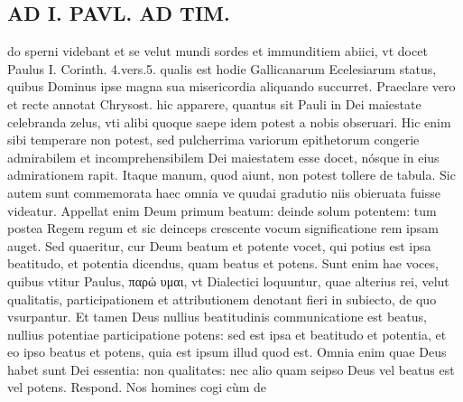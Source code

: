 \documentclass{article}
\begin{document}
\begin{pages}
\section*{AD I. PAVL. AD TIM. }
\marginpar{[ p.300 ]}\pstart do sperni videbant et se velut mundi sordes et immunditiem abiici, vt docet Paulus I. Corinth. 4.vers.5. qualis est hodie Gallicanarum Ecelesiarum status, quibus Dominus ipse magna sua misericordia aliquando succurret. Praeclare vero et recte annotat Chrysost. hic apparere, quantus sit Pauli in Dei maiestate celebranda zelus, vti alibi quoque saepe idem potest a nobis obseruari. Hic enim sibi temperare non potest, sed pulcherrima variorum epithetorum congerie admirabilem et incomprehensibilem Dei maiestatem esse docet, nósque in eius admirationem rapit. Itaque manum, quod aiunt, non potest tollere de tabula. Sic autem sunt commemorata haec omnia ve quudai gradutio niis obieruata fuisse videatur. Appellat enim Deum primum beatum: deinde solum potentem: tum postea Regem regum et sic deinceps crescente vocum significatione rem ipsam auget.  \pend\pstart Sed quaeritur, cur Deum beatum et potente vocet, qui potius est ipsa beatitudo, et potentia dicendus, quam beatus et potens. Sunt enim hae voces, quibus vtitur Paulus, παρώ υμαι, vt Dialectici loquuntur, quae alterius rei, velut qualitatis, participationem et attributionem denotant fieri in subiecto, de quo vsurpantur. Et tamen Deus nullius beatitudinis communicatione est beatus, nullius potentiae participatione potens: sed est ipsa et beatitudo et potentia, et eo ipso beatus et potens, quia est ipsum illud quod est. Omnia enim quae Deus habet sunt Dei essentia: non qualitates: nec alio quam seipso Deus vel beatus est vel potens. Respond. Nos homines cogi cùm de  \pend

\end{pages}
\end{document}
